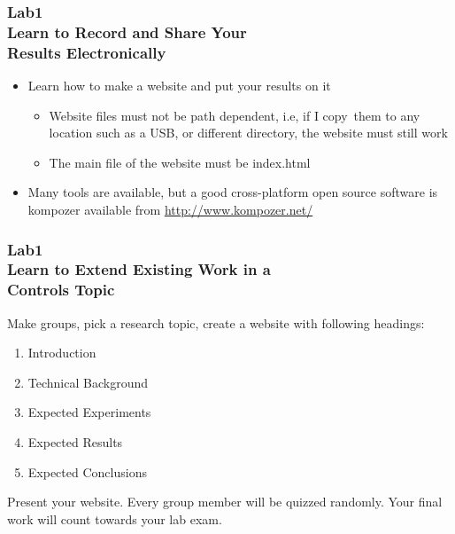\documentclass[hyperref={pdfpagelabels=true}]{beamer}
\begin{document}
\begin{frame}
\frametitle{Lab1 \\{\large Learn to Record and Share Your \\ Results Electronically}}
\begin{itemize}
\item Learn how to make a website and put your results on it
\begin{itemize}
\item Website files must not be path dependent, i.e, if I copy\
them to any location such as a USB, or different directory,
the website must still work
\item The main file of the website must be index.html
\end{itemize}
\item Many tools are available, but a good cross-platform open source
software is kompozer available from \url{http://www.kompozer.net/}
\end{itemize}
\end{frame}



\begin{frame}
\frametitle{Lab1 \\{\large Learn to Extend Existing Work in a \\ Controls Topic}}
Make groups, pick a research topic, create a website with following
headings:
\begin{enumerate}
\item Introduction
\item Technical Background
\item Expected Experiments
\item Expected Results
\item Expected Conclusions
\end{enumerate}
Present your website. Every group member will be quizzed randomly.
Your final work will count towards your lab exam.
\end{frame}
\end{document}
